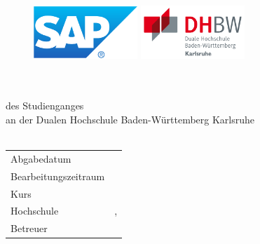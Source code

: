 \singlespacing

\thispagestyle{empty}
\begin{titlepage}

\begin{figure}           %
	\begin{minipage}{0.49\textwidth}
		\flushleft
		\includegraphics[height=2cm]{images/logos/Logo_SAP.pdf} 
	\end{minipage}
	\hfill
	\begin{minipage}{0.49\textwidth}
		\flushright
		\includegraphics[height=2cm]{images/logos/Logo_DHBW.pdf} 
	\end{minipage}
\end{figure} 
\vspace*{1.0cm}

\begin{center}
	\huge{\thetitle}\\[3cm]
	\Large{\arbeit}\\[1cm]
	\normalsize{des Studienganges \studiengang}\\[1ex]
	\normalsize{an der Dualen Hochschule Baden-Württemberg Karlsruhe}\\[1cm]
	\Large{\theauthor} \\[3cm]
\end{center}

\begin{center}
	\vfill
	\setlength\tabcolsep{3em}
	\begin{tabular}{ll}
		Abgabedatum                     & \abgabe \\[0.2cm]
		Bearbeitungszeitraum            & \bearbeitungszeitraum \\[0.2cm]
		Kurs            								& \kurs \\[0.2cm]
		Hochschule                			& \firmaName, \firmaOrt \\[0.2cm]
		Betreuer 											  & \betreuerDhbw \\[0.8cm]
	\end{tabular} 
\end{center}

\restoregeometry
\end{titlepage}

\onehalfspacing